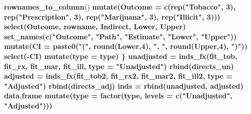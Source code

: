 \documentclass[]{DissertateUSU}
\newenvironment{Shaded}{\begin{snugshade}}{\end{snugshade}}
\newcommand{\KeywordTok}[1]{\textcolor[rgb]{0.13,0.29,0.53}{\textbf{#1}}}
\newcommand{\DataTypeTok}[1]{\textcolor[rgb]{0.13,0.29,0.53}{#1}}
\newcommand{\DecValTok}[1]{\textcolor[rgb]{0.00,0.00,0.81}{#1}}
\newcommand{\StringTok}[1]{\textcolor[rgb]{0.31,0.60,0.02}{#1}}
\newcommand{\OperatorTok}[1]{\textcolor[rgb]{0.81,0.36,0.00}{\textbf{#1}}}
\newcommand{\NormalTok}[1]{#1}
\begin{document}
\begin{Shaded}
\begin{Highlighting}[]
{{{{{{{{{{{{{{{{{{{{{\StringTok{    }\KeywordTok{rownames_to_column}\NormalTok{() }\OperatorTok{%
\StringTok{    }\KeywordTok{mutate}\NormalTok{(}\DataTypeTok{Outcome =} \KeywordTok{c}\NormalTok{(}\KeywordTok{rep}\NormalTok{(}\StringTok{"Tobacco"}\NormalTok{, }\DecValTok{3}\NormalTok{), }
                       \KeywordTok{rep}\NormalTok{(}\StringTok{"Prescription"}\NormalTok{, }\DecValTok{3}\NormalTok{),}
                       \KeywordTok{rep}\NormalTok{(}\StringTok{"Marijuana"}\NormalTok{, }\DecValTok{3}\NormalTok{), }
                       \KeywordTok{rep}\NormalTok{(}\StringTok{"Illicit"}\NormalTok{, }\DecValTok{3}\NormalTok{))) }\OperatorTok{%
\StringTok{    }\KeywordTok{select}\NormalTok{(Outcome, rowname, Indirect, Lower, Upper) }\OperatorTok{%
\StringTok{    }\KeywordTok{set_names}\NormalTok{(}\KeywordTok{c}\NormalTok{(}\StringTok{"Outcome"}\NormalTok{, }\StringTok{"Path"}\NormalTok{, }\StringTok{"Estimate"}\NormalTok{, }
                \StringTok{"Lower"}\NormalTok{, }\StringTok{"Upper"}\NormalTok{)) }\OperatorTok{%
\StringTok{    }\KeywordTok{mutate}\NormalTok{(}\DataTypeTok{CI =} \KeywordTok{paste0}\NormalTok{(}\StringTok{"("}\NormalTok{, }\KeywordTok{round}\NormalTok{(Lower,}\DecValTok{4}\NormalTok{), }\StringTok{", "}\NormalTok{, }
                       \KeywordTok{round}\NormalTok{(Upper,}\DecValTok{4}\NormalTok{), }\StringTok{")"}\NormalTok{)) }\OperatorTok{%
\StringTok{    }\KeywordTok{select}\NormalTok{(}\OperatorTok{-}\NormalTok{CI) }\OperatorTok{%
\StringTok{    }\KeywordTok{mutate}\NormalTok{(}\DataTypeTok{type =}\NormalTok{ type)}
\NormalTok{\}}
\NormalTok{unadjusted =}\StringTok{ }\KeywordTok{inds_fx}\NormalTok{(fit_tob, }
\NormalTok{                     fit_rx, }
\NormalTok{                     fit_mar, }
\NormalTok{                     fit_ill, }
                     \DataTypeTok{type =} \StringTok{"Unadjusted"}\NormalTok{) }\OperatorTok{%
\StringTok{  }\KeywordTok{rbind}\NormalTok{(directs_un)}
\NormalTok{adjusted =}\StringTok{ }\KeywordTok{inds_fx}\NormalTok{(fit_tob2, }
\NormalTok{                   fit_rx2, }
\NormalTok{                   fit_mar2, }
\NormalTok{                   fit_ill2, }
                   \DataTypeTok{type =} \StringTok{"Adjusted"}\NormalTok{) }\OperatorTok{%
\StringTok{  }\KeywordTok{rbind}\NormalTok{(directs_adj)}
\NormalTok{inds =}\StringTok{ }\KeywordTok{rbind}\NormalTok{(unadjusted, adjusted) }\OperatorTok{%
\StringTok{  }\NormalTok{data.frame }\OperatorTok{%
\StringTok{  }\KeywordTok{mutate}\NormalTok{(}\DataTypeTok{type =} \KeywordTok{factor}\NormalTok{(type, }
                       \DataTypeTok{levels =} \KeywordTok{c}\NormalTok{(}\StringTok{"Unadjusted"}\NormalTok{, }\StringTok{"Adjusted"}\NormalTok{))) }\OperatorTok{%
}}}}}}}}}}}}}}}}}}}}}}}}}}}}}}}}
\end{Highlighting}
\end{Shaded}
\end{document}
